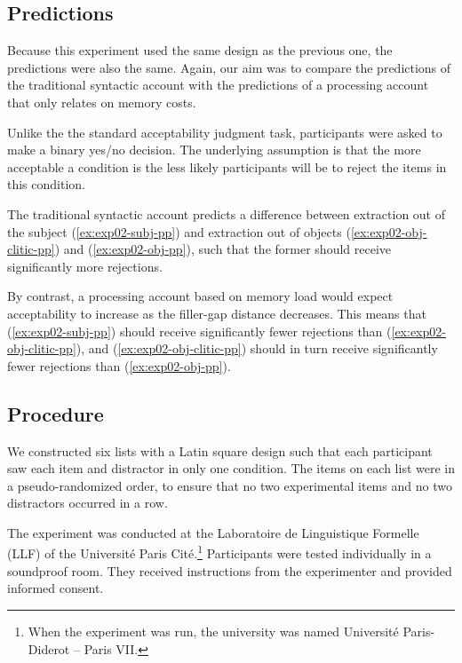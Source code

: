 \subsection{Predictions}

Because this experiment used the same design as the previous one, the predictions were also the same. Again, our aim was to compare the predictions of the traditional syntactic account with the predictions of a processing account that only relates on memory costs.

Unlike the the standard acceptability judgment task, participants were asked to make a binary yes/no decision. The underlying assumption is that the more acceptable a condition is the less likely participants will be to reject the items in this condition.

The traditional syntactic account predicts a difference between extraction out of the subject (\ref{ex:exp02-subj-pp}) and extraction out of objects (\ref{ex:exp02-obj-clitic-pp}) and (\ref{ex:exp02-obj-pp}), such that the former should receive significantly more rejections.

By contrast, a processing account based on memory load would expect acceptability to increase as the filler-gap distance decreases. This means that (\ref{ex:exp02-subj-pp}) should receive significantly fewer rejections than (\ref{ex:exp02-obj-clitic-pp}), and (\ref{ex:exp02-obj-clitic-pp}) should in turn receive significantly fewer rejections than (\ref{ex:exp02-obj-pp}). 


\subsection{Procedure}

We constructed six lists with a Latin square design such that each participant saw each item and distractor in only one condition. The items on each list were in a pseudo-randomized order, to ensure that no two experimental items and no two distractors occurred in a row.

The experiment was conducted at the Laboratoire de Linguistique Formelle (LLF) of the Université Paris Cité.\footnote{When the experiment was run, the university was named Université Paris-Diderot -- Paris VII.} Participants were tested individually in a soundproof room. They received instructions from the experimenter and provided informed consent.

